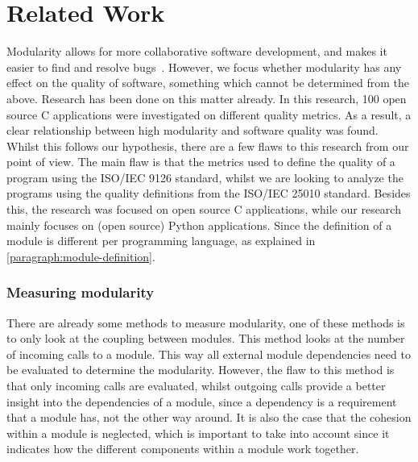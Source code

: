 \documentclass[twoside]{uva-inf-bachelor-thesis}
\begin{document}
\chapter{Related Work}
Modularity allows for more collaborative software development, and makes it easier to find and resolve bugs~\cite{LinuxKernel,lee2000linux}. However, we focus whether modularity has any effect on the quality of software, something which cannot be determined from the above. Research has been done on this matter already\cite{stamelos2002code}. In this research, 100 open source C applications were investigated on different quality metrics. As a result, a clear relationship between high modularity and software quality was found. Whilst this follows our hypothesis, there are a few flaws to this research from our point of view. The main flaw is that the metrics used to define the quality of a program using the ISO/IEC 9126 standard\cite{ISO9126}, whilst we are looking to analyze the programs using the quality definitions from the ISO/IEC 25010 standard\cite{ISO25010}. Besides this, the research was focused on open source C applications, while our research mainly focuses on (open source) Python applications. Since the definition of a module is different per programming language, as explained in \autoref{paragraph:module-definition}.

\subsection*{Measuring modularity}
There are already some methods to measure modularity\cite{BetterCodeHub,visser2016building,emanuel2013modularity}, one of these methods is to only look at the coupling between modules\cite{BetterCodeHub,visser2016building}. This method looks at the number of incoming calls to a module. This way all external module dependencies need to be evaluated to determine the modularity. However, the flaw to this method is that only incoming calls are evaluated, whilst outgoing calls provide a better insight into the dependencies of a module, since a dependency is a requirement that a module has, not the other way around. It is also the case that the cohesion within a module is neglected, which is important to take into account since it indicates how the different components within a module work together.
\end{document}
